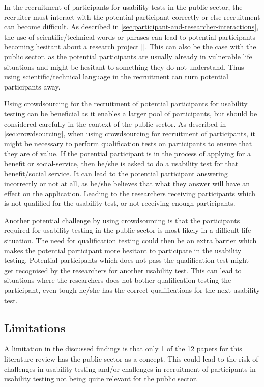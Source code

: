 In the recruitment of participants for usability tests in the public sector, the recruiter must interact with the potential participant correctly or else recruitment can become difficult. As described in \autoref{sec:participant-and-researcher-interactions}, the use of scientific/technical words or phrases can lead to potential participants becoming hesitant about a research project [\cite{pkf_2018}]. This can also be the case with the public sector, as the potential participants are usually already in vulnerable life situations and might be hesitant to something they do not understand. Thus using scientific/technical language in the recruitment can turn potential participants away.

Using crowdsourcing for the recruitment of potential participants for usability testing can be beneficial as it enables a larger pool of participants, but should be considered carefully in the context of the public sector. As described in \autoref{sec:crowdsourcing}, when using crowdsourcing for recruitment of participants, it might be necessary to perform qualification tests on participants to ensure that they are of value. If the potential participant is in the process of applying for a benefit or social-service, then he/she is asked to do a usability test for that benefit/social service. It can lead to the potential participant answering incorrectly or not at all, as he/she believes that what they answer will have an effect on the application. Leading to the researchers receiving participants which is not qualified for the usability test, or not receiving enough participants. 

Another potential challenge by using crowdsourcing is that the participants required for usability testing in the public sector is most likely in a difficult life situation. The need for qualification testing could then be an extra barrier which makes the potential participant more hesitant to participate in the usability testing. Potential participants which does not pass the qualification test might get recognised by the researchers for another usability test. This can lead to situations where the researchers does not bother qualification testing the participant, even tough he/she has the correct qualifications for the next usability test.

\subsection{Limitations}
A limitation in the discussed findings is that only 1 of the 12 papers for this literature review has the public sector as a concept. This could lead to the risk of  challenges in usability testing and/or challenges in recruitment of participants in usability testing not being quite relevant for the public sector. 

